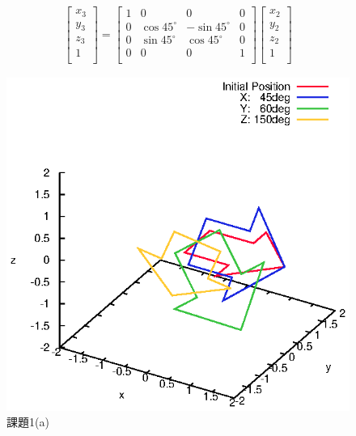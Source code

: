 \documentclass[a4paper,10pt]{jsarticle}
\begin{document}
\begin{eqnarray}
\label{eq:f}
  \left[
    \begin{array}{c}
      x_3\\
      y_3\\
      z_3\\
      1\\
    \end{array}
  \right] =
  \left[
    \begin{array}{cccc}
      1 & 0 & 0 & 0 \\
      0 & \cos{45^\circ} & -\sin{45^\circ} & 0\\
      0 & \sin{45^\circ} & \cos{45^\circ} & 0\\
      0 & 0 & 0 & 1\\
    \end{array}
  \right]\left[
    \begin{array}{c}
      x_2\\
      y_2\\
      z_2\\
      1\\
    \end{array}
  \right]
\end{eqnarray}

\begin{figure}[p]
  \begin{center}
    \includegraphics[clip,width=14cm]{fig/eps/1(a).eps}
  \end{center}
  \caption{課題1(a)}
  \label{fig:課題1(a)}
\end{figure}
\end{document}

